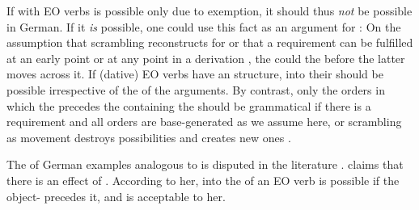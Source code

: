 \documentclass[output=paper,colorlinks,citecolor=brown]{langscibook}
\begin{document}

If  with EO verbs is possible only due to exemption, it should thus \emph{not} be possible in German.
If it \emph{is} possible, one could use this fact as an argument for :
On the assumption that scrambling reconstructs for  or that a  requirement can be fulfilled at an early point or at any point in a derivation \parencite[as assumed by i.a.][]{grewendorf_scrambling_1999,mueller}, the  could  the  before the latter moves across it.
If (dative) EO verbs have an  structure,  into their  should be possible irrespective of the  of the arguments.
By contrast, only the orders in which the  precedes the  containing the  should be grammatical if there is a  requirement and all orders are base-generated as we assume here, or scrambling as movement destroys  possibilities and creates new ones \parencite[as is frequently assumed, see e.g.][]{haider_mittelfeld_2017}.

The  of German examples analogous to  is disputed in the literature \parencite[cf.][]{kiss_reflexivity_2012,platzack_backward_2012,fischer_theories_2015,temme_backward_2017}. 
\textcite{fischer_theories_2015} claims that there is an effect of . 
According to her,  into the  of an EO verb is possible if the  object- precedes it, and  is acceptable to her.
\end{document}
